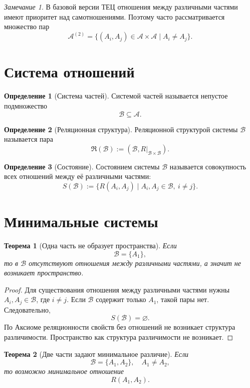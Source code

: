 \documentclass[12pt,a4paper,oneside]{book}
\theoremstyle{definition}
\newtheorem{definition}{Определение}[chapter]
\theoremstyle{plain}
\newtheorem{theorem}{Теорема}[chapter]
\theoremstyle{remark}
\newtheorem{remark}{Замечание}[chapter]
\newcommand{\Parts}{\mathcal A}
\newcommand{\SubParts}{\mathcal B}
\newcommand{\Rel}{R}
\newcommand{\State}{S}
\begin{document}
\begin{remark}
В базовой версии ТЕЦ отношения между различными частями имеют приоритет над самотношениями. Поэтому часто рассматривается множество пар
\[
\Parts^{(2)}=\{(A_i,A_j)\in \Parts\times\Parts\mid A_i\neq A_j\}.
\]
\end{remark}

\section{Система отношений}

\begin{definition}[Система частей]
Системой частей называется непустое подмножество
\[
\SubParts \subseteq \Parts.
\]
\end{definition}

\begin{definition}[Реляционная структура]
Реляционной структурой системы \(\SubParts\) называется пара
\[
\mathfrak R(\SubParts) := (\SubParts,\Rel|_{\SubParts\times\SubParts}).
\]
\end{definition}

\begin{definition}[Состояние]
Состоянием системы \(\SubParts\) называется совокупность всех отношений между её различными частями:
\[
\State(\SubParts):=\{\Rel(A_i,A_j)\mid A_i,A_j\in\SubParts,\ i\neq j\}.
\]
\end{definition}

\section{Минимальные системы}

\begin{theorem}[Одна часть не образует пространства]
Если
\[
\SubParts=\{A_1\},
\]
то в \(\SubParts\) отсутствуют отношения между различными частями, а значит не возникает пространство.
\end{theorem}

\begin{proof}
Для существования отношения между различными частями нужны \(A_i,A_j\in\SubParts\), где \(i\neq j\). Если \(\SubParts\) содержит только \(A_1\), такой пары нет. Следовательно,
\[
\State(\SubParts)=\varnothing.
\]
По Аксиоме реляционности свойств без отношений не возникает структура различимости. Пространство как структура различимости не возникает.
\end{proof}

\begin{theorem}[Две части задают минимальное различие]
Если
\[
\SubParts=\{A_1,A_2\},\quad A_1\neq A_2,
\]
то возможно минимальное отношение
\[
\Rel(A_1,A_2).
\]
\end{theorem}
\end{document}
